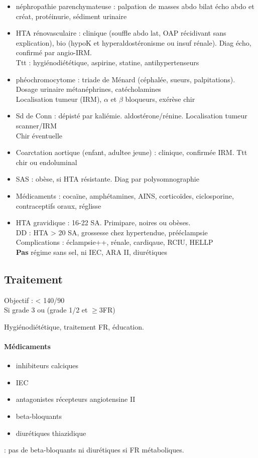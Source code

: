 \begin{itemize}
  \item néphropathie parenchymateuse : palpation de masses abdo bilat \thus écho
    abdo et créat, protéinurie, sédiment urinaire
  \item HTA rénovasculaire : clinique (souffle abdo lat, OAP récidivant sans
    explication), bio (hypoK et hyperaldostéronisme ou insuf rénale). Diag
    écho, confirmé par angio-IRM. \\
    Ttt : hygiénodiététique, aspirine, statine, antihypertenseurs
  \item phéochromocytome : triade de Ménard (céphalée, sueurs, palpitations).
    Dosage urinaire métanéphrines, catécholamines\\
    Localisation tumeur (IRM), $\alpha$ et $\beta$ bloqueurs, exérèse chir
  \item Sd de Conn : dépisté par kaliémie. \inc aldostérone/rénine. Localisation
    tumeur scanner/IRM\\
    Chir éventuelle
  \item Coarctation aortique (enfant, adultee jeune) : clinique, confirmée IRM.
    Ttt chir ou endoluminal
  \item SAS : obèse, si HTA résistante. Diag par polysomnographie
  \item Médicaments : cocaïne, amphétamines, AINS, corticoïdes, ciclosporine,
    contraceptifs oraux, réglisse
  \item HTA gravidique : 16-22 SA. Primipare, noires ou obèses.\\
    DD : HTA > 20 SA, grossesse chez hypertendue, prééclampsie\\
    Complications : éclampsie++, rénale, cardiqaue, RCIU, HELLP\\
    \textbf{Pas} régime sans sel, ni IEC, ARA II, diurétiques
\end{itemize}

\subsection{Traitement}
Objectif : < 140/90\\
Si grade 3 ou (grade 1/2 et $\ge 3$FR)

Hygiénodiététique, traitement FR, éducation.

\paragraph{Médicaments}
\begin{itemize}
  \item inhibiteurs calciques
  \item IEC
  \item antagonistes récepteurs angiotensine II
  \item beta-bloquants
  \item diurétiques thiazidique
\end{itemize}
\danger : pas de beta-bloquants ni diurétiques si FR métaboliques.\\

